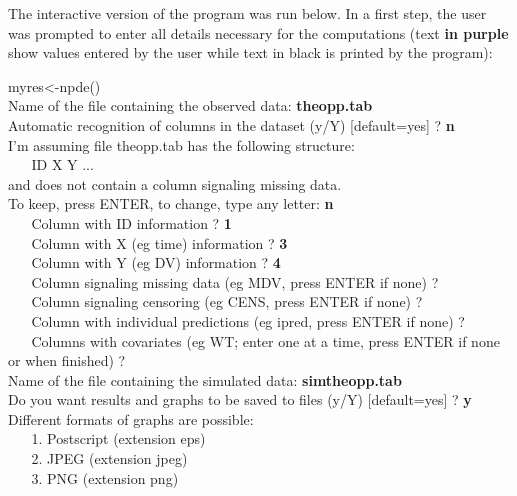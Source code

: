 \hskip 18pt The interactive version of the program was run below. In a first step, the user was prompted to enter all details necessary for the computations (text \textcolor{mycol}{\bf in purple} show values entered by the user while text in black is printed by the program):

\bigskip
{\sf
\noindent myres<-npde() \\
Name of the file containing the observed data: \textcolor{mycol}{\bf theopp.tab}\\
Automatic recognition of columns in the dataset (y/Y) [default=yes] ? \textcolor{mycol}{\bf n}\\
I'm assuming file theopp.tab has the following structure:\\
$\phantom{me}$\hskip 0.5cm        ID X Y ...\\
and does not contain a column signaling missing data.\\
To keep, press ENTER, to change, type any letter: \textcolor{mycol}{\bf n}\\
$\phantom{me}$\hskip 0.5cm Column with ID information ? \textcolor{mycol}{\bf 1}\\
$\phantom{me}$\hskip 0.5cm Column with X (eg time) information ? \textcolor{mycol}{\bf 3}\\
$\phantom{me}$\hskip 0.5cm Column with Y (eg DV) information ? \textcolor{mycol}{\bf 4}\\
$\phantom{me}$\hskip 0.5cm Column signaling missing data (eg MDV, press ENTER if none) ? \\
$\phantom{me}$\hskip 0.5cm Column signaling censoring (eg CENS, press ENTER if none) ? \\
$\phantom{me}$\hskip 0.5cm Column with individual predictions (eg ipred, press ENTER if none) ?  \\
$\phantom{me}$\hskip 0.5cm Columns with covariates (eg WT; enter one at a time, press ENTER if none or when finished) ?  \\
Name of the file containing the simulated data: \textcolor{mycol}{\bf 
simtheopp.tab}\\
Do you want results and graphs to be saved to files (y/Y) [default=yes] ? \textcolor{mycol}{\bf y}\\
Different formats of graphs are possible:\\
$\phantom{me}$\hskip 0.5cm         1. Postscript (extension eps)\\
$\phantom{me}$\hskip 0.5cm         2. JPEG (extension jpeg)\\
$\phantom{me}$\hskip 0.5cm         3. PNG (extension png)\\
}
